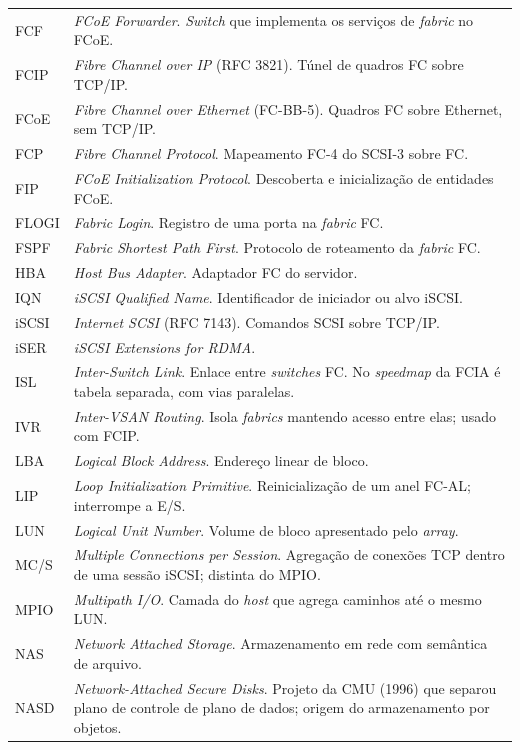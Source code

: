 \documentclass[11pt,a4paper]{article}
\begin{document}
{\begin{longtable}{@{}p{1.9cm}p{13.2cm}@{}}
FCF & \textit{FCoE Forwarder}. \textit{Switch} que implementa os serviços de \textit{fabric} no FCoE. \\
FCIP & \textit{Fibre Channel over IP} (RFC 3821). Túnel de quadros FC sobre TCP/IP. \\
FCoE & \textit{Fibre Channel over Ethernet} (FC-BB-5). Quadros FC sobre Ethernet, sem TCP/IP. \\
FCP & \textit{Fibre Channel Protocol}. Mapeamento FC-4 do SCSI-3 sobre FC. \\
FIP & \textit{FCoE Initialization Protocol}. Descoberta e inicialização de entidades FCoE. \\
FLOGI & \textit{Fabric Login}. Registro de uma porta na \textit{fabric} FC. \\
FSPF & \textit{Fabric Shortest Path First}. Protocolo de roteamento da \textit{fabric} FC. \\
HBA & \textit{Host Bus Adapter}. Adaptador FC do servidor. \\
IQN & \textit{iSCSI Qualified Name}. Identificador de iniciador ou alvo iSCSI. \\
iSCSI & \textit{Internet SCSI} (RFC 7143). Comandos SCSI sobre TCP/IP. \\
iSER & \textit{iSCSI Extensions for RDMA}. \\
ISL & \textit{Inter-Switch Link}. Enlace entre \textit{switches} FC. No \textit{speedmap} da FCIA é
tabela separada, com vias paralelas. \\
IVR & \textit{Inter-VSAN Routing}. Isola \textit{fabrics} mantendo acesso entre elas; usado com FCIP. \\
LBA & \textit{Logical Block Address}. Endereço linear de bloco. \\
LIP & \textit{Loop Initialization Primitive}. Reinicialização de um anel FC-AL; interrompe a E/S. \\
LUN & \textit{Logical Unit Number}. Volume de bloco apresentado pelo \textit{array}. \\
MC/S & \textit{Multiple Connections per Session}. Agregação de conexões TCP dentro de uma sessão
iSCSI; distinta do MPIO. \\
MPIO & \textit{Multipath I/O}. Camada do \textit{host} que agrega caminhos até o mesmo LUN. \\
NAS & \textit{Network Attached Storage}. Armazenamento em rede com semântica de arquivo. \\
NASD & \textit{Network-Attached Secure Disks}. Projeto da CMU (1996) que separou plano de controle
de plano de dados; origem do armazenamento por objetos. \\

\end{longtable}}
\end{document}
